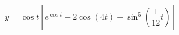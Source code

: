 \documentclass[preview]{standalone}
\begin{document}
\begin{align*}
y = \cos t \left[e^{\cos t}-2\cos \left( 4t \right) + \sin^5 \left(\dfrac{1}{12}t\right) \right]
\end{align*}
\end{document}
